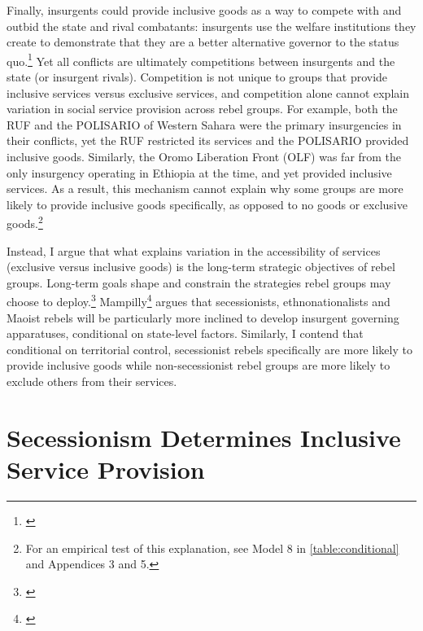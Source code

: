 \documentclass[12pt, letterpaper]{article}
\begin{document}
Finally, insurgents could provide inclusive goods as a way to compete with and outbid the state and rival combatants: insurgents use the welfare institutions they create to demonstrate that they are a better alternative governor to the status quo.\footnote{\citealt{bloom2004palestinian,grynkewich2008welfare}} Yet all conflicts are ultimately competitions between insurgents and the state (or insurgent rivals). Competition is not unique to groups that provide inclusive services versus exclusive services, and competition alone cannot explain variation in social service provision across rebel groups. For example, both the RUF and the POLISARIO of Western Sahara were the primary insurgencies in their conflicts, yet the RUF restricted its services and the POLISARIO provided inclusive goods. Similarly, the Oromo Liberation Front (OLF) was far from the only insurgency operating in Ethiopia at the time, and yet provided inclusive services. As a result, this mechanism cannot explain why some groups are more likely to provide inclusive goods specifically, as opposed to no goods or exclusive goods.\footnote{For an empirical test of this explanation, see Model 8 in \autoref{table:conditional} and Appendices 3 and 5.}  

Instead, I argue that what explains variation in the accessibility of services (exclusive versus inclusive goods) is the long-term strategic objectives of rebel groups. Long-term goals shape and constrain the strategies rebel groups may choose to deploy.\footnote{\citealt[16]{mampilly2011rebel}} Mampilly\footnote{\citealt[77-8]{mampilly2011rebel}} argues that secessionists, ethnonationalists and Maoist rebels will be particularly more inclined to develop insurgent governing apparatuses, conditional on state-level factors. Similarly, I contend that conditional on territorial control, secessionist rebels specifically are more likely to provide inclusive goods while non-secessionist rebel groups are more likely to exclude others from their services. 


\section*{Secessionism Determines Inclusive Service Provision}
\end{document}
